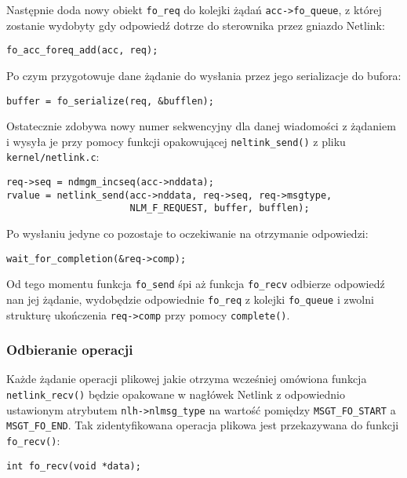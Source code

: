 \documentclass[10pt]{scrartcl}
\begin{document}
Następnie doda nowy obiekt \texttt{fo\_req} do kolejki żądań \texttt{acc-\textgreater{}fo\_queue}, z której zostanie wydobyty gdy odpowiedź dotrze do sterownika przez gniazdo Netlink:

\begin{verbatim}
fo_acc_foreq_add(acc, req);
\end{verbatim}

Po czym przygotowuje dane żądanie do wysłania przez jego serializacje do bufora:

\begin{verbatim}
buffer = fo_serialize(req, &bufflen);
\end{verbatim}

Ostatecznie zdobywa nowy numer sekwencyjny dla danej wiadomości z żądaniem i wysyła je przy pomocy funkcji opakowującej \texttt{neltink\_send()} z pliku \texttt{kernel/netlink.c}:

\begin{verbatim}
req->seq = ndmgm_incseq(acc->nddata);
rvalue = netlink_send(acc->nddata, req->seq, req->msgtype,
                      NLM_F_REQUEST, buffer, bufflen);
\end{verbatim}

Po wysłaniu jedyne co pozostaje to oczekiwanie na otrzymanie odpowiedzi:

\begin{verbatim}
wait_for_completion(&req->comp);
\end{verbatim}

Od tego momentu funkcja \texttt{fo\_send} śpi aż funkcja \texttt{fo\_recv} odbierze odpowiedź nan jej żądanie, wydobędzie odpowiednie \texttt{fo\_req} z kolejki \texttt{fo\_queue} i zwolni strukturę ukończenia \texttt{req-\textgreater{}comp} przy pomocy \texttt{complete()}.

\subsubsection{Odbieranie operacji}
\label{forecv}

Każde żądanie operacji plikowej jakie otrzyma wcześniej omówiona funkcja \texttt{netlink\_recv()} będzie opakowane w nagłówek Netlink z odpowiednio ustawionym atrybutem \texttt{nlh-\textgreater{}nlmsg\_type} na wartość pomiędzy \texttt{MSGT\_FO\_START} a \texttt{MSGT\_FO\_END}.  Tak zidentyfikowana operacja plikowa jest przekazywana do funkcji \texttt{fo\_recv()}:

\begin{verbatim}
int fo_recv(void *data);
\end{verbatim}
\end{document}
